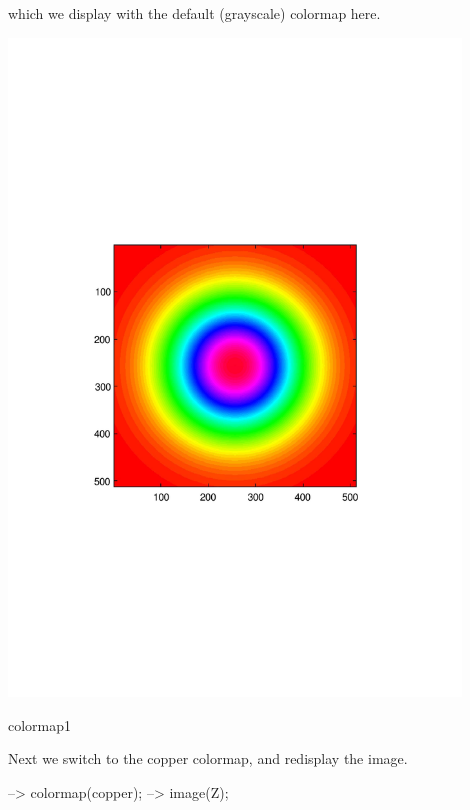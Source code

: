 which we display with the default (grayscale) colormap here.  
\begin{DoxyImage}
\includegraphics[width=12cm]{colormap1}
\caption{colormap1}
\end{DoxyImage}


Next we switch to the {\ttfamily copper} colormap, and redisplay the image.


\begin{DoxyVerbInclude}
--> colormap(copper);
--> image(Z);
\end{DoxyVerbInclude}


